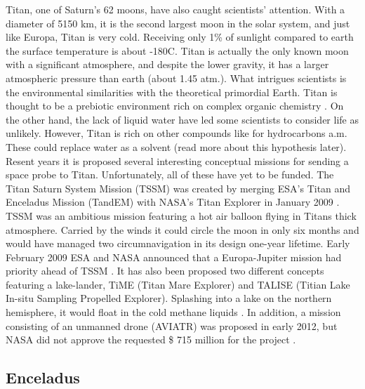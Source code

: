 \begin{multicols}{2}
Titan, one of Saturn's 62 moons, have also caught scientists' attention.
With a diameter of 5150 km, it is the second largest moon in the solar system, and just like Europa, Titan is very cold.
Receiving only 1\% of sunlight compared to earth the surface temperature is about -180\degree C.
Titan is actually the only known moon with a significant atmosphere, and despite the lower gravity, it has a larger atmospheric pressure than earth (about 1.45 atm.).
What intrigues scientists is the environmental similarities with the theoretical primordial Earth.
Titan is thought to be a prebiotic environment rich on complex organic chemistry \cite{RichOrganics}. On the other hand, the lack of liquid water have led some scientists to consider life as unlikely.
However, Titan is rich on other compounds like for hydrocarbons a.m.
These could replace water as a solvent (read more about this hypothesis later).
Resent years it is proposed several interesting conceptual missions for sending a space probe to Titan. Unfortunately, all of these have yet to be funded.
The Titan Saturn System Mission (TSSM) was created by merging ESA’s Titan and Enceladus Mission (TandEM) with NASA’s Titan Explorer in January 2009 \cite{FPlan10}.
TSSM was an ambitious mission featuring a hot air balloon flying in Titans thick atmosphere.
Carried by the winds it could circle the moon in only six months and would have managed two circumnavigation in its design one-year lifetime.
Early February 2009 ESA and NASA announced that a Europa-Jupiter mission had priority ahead of TSSM \cite{FPlan07}.
It has also been proposed two different concepts featuring a lake-lander, TiME (Titan Mare Explorer) and TALISE (Titian Lake In-situ Sampling Propelled Explorer).
Splashing into a lake on the northern hemisphere, it would float in the cold methane liquids \cite{TiME} \cite{TALISE}.
In addition, a mission consisting of an unmanned drone (AVIATR) was proposed in early 2012, but NASA did not approve the requested \$ 715 million for the project \cite{AVIATR}.

\subsection*{Enceladus}


 

\end{multicols}
